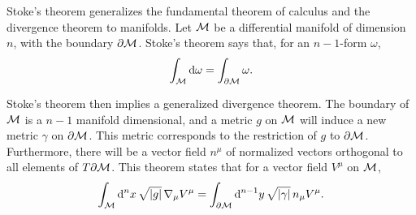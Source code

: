 Stoke's theorem generalizes the fundamental theorem of calculus and the divergence theorem to manifolds.
Let $\mathcal{M}$ be a differential manifold of dimension $n$, with the boundary $\partial \mathcal{M}$.
Stoke's theorem says that, for an $n-1$-form $\omega$,
%
\begin{equation}
    \int_{\mathcal{M}} \dd \omega = \int_{\partial \mathcal{M}}  \omega. 
\end{equation}

Stoke's theorem then implies a generalized divergence theorem.
The boundary of $\mathcal{M}$ is a $n-1$ manifold dimensional, and a metric $g$ on $\mathcal{M}$ will induce a new metric $\gamma$ on $\partial \mathcal{M}$.
This metric corresponds to the restriction of $g$ to $\partial \mathcal{M}$.
Furthermore, there will be a vector field $n^\mu$ of normalized vectors orthogonal to all elements of $T \partial \mathcal{M}$.
This theorem states that for a vector field $V^\mu$ on $\mathcal{M}$,
%
\begin{equation}
    \label{generalized divergence theorem}
    \int_{\mathcal{M}} \dd^n x \, \sqrt{|g|} \,  \nabla_\mu V^\mu 
    = \int_{\partial \mathcal{M}} \dd^{n-1}y \, \sqrt{|\gamma|} \, n_\mu V^\mu.
\end{equation}
